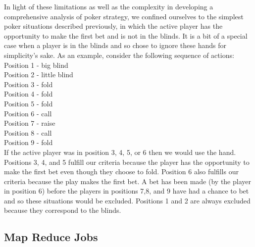 \documentclass[twoside]{article}
\begin{document}
\begin{multicols}{2}
In light of these limitations as well as the complexity in developing a comprehensive analysis of poker strategy, we confined ourselves to the simplest poker situations described previously, in which the active player has the opportunity to make the first bet and is not in the blinds. It is a bit of a special case when a player is in the blinds and so chose to ignore these hands for simplicity's sake. As an example, consider the following sequence of actions:\\
\indent Position 1 - big blind\\
\indent Position 2 - little blind\\
\indent Position 3 - fold\\
\indent Position 4 - fold\\
\indent Position 5 - fold\\
\indent Position 6 - call\\
\indent Position 7 - raise\\
\indent Position 8 - call\\
\indent Position 9 - fold\\
If the active player was in position 3, 4, 5, or 6 then we would use the hand. Positions 3, 4, and 5 fulfill our criteria because the player has the opportunity to make the first bet even though they choose to fold. Position 6 also fulfills our criteria because the play makes the first bet. A bet has been made (by the player in position 6) before the players in positions 7,8, and 9 have had a chance to bet and so these situations would be excluded. Positions 1 and 2 are always excluded because they correspond to the blinds.

\subsection{Map Reduce Jobs}


\end{multicols}
\end{document}
